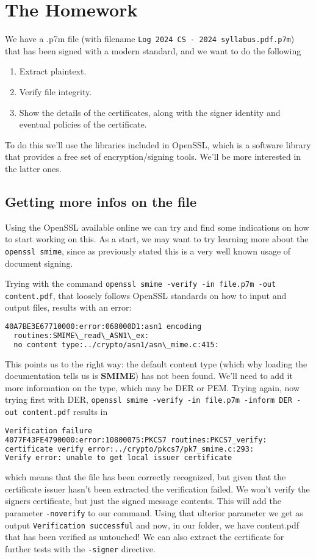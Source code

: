 \documentclass{article}
\begin{document}
\section{The Homework}
We have a .p7m file (with filename \texttt{Log 2024 CS - 2024 syllabus.pdf.p7m}) that has been signed with a modern standard, and we want to do the following
\begin{enumerate}
    \item Extract plaintext.
    \item Verify file integrity.
    \item Show the details of the certificates, along with the signer identity and eventual policies of the certificate.
\end{enumerate}
To do this we'll use the libraries included in OpenSSL, which is a software library that provides a free set of encryption/signing tools. We'll be more interested in the latter ones.

\subsection{Getting more infos on the file}
Using the OpenSSL available online we can try and find some indications on how to start working on this. 
As a start, we may want to try learning more about the \texttt{openssl smime}, since as previously stated this is a very well known usage of document signing.

Trying with the command \texttt{openssl smime -verify -in file.p7m -out content.pdf}, that loosely follows OpenSSL standards on how to input and output files, results with an error:
\begin{lstlisting}[language=bash]
  40A7BE3E67710000:error:068000D1:asn1 encoding 
  routines:SMIME\_read\_ASN1\_ex:
  no content type:../crypto/asn1/asn\_mime.c:415:
\end{lstlisting}
This points us to the right way: the default content type (which why loading the documentation tells us is \textbf{SMIME}) has not been found. We'll need to add it more information on the type, which may be DER or PEM.
Trying again, now trying first with DER, \texttt{openssl smime -verify -in file.p7m -inform DER -out content.pdf} results in 
\begin{lstlisting}[language=bash]
    Verification failure
4077F43FE4790000:error:10800075:PKCS7 routines:PKCS7_verify:
certificate verify error:../crypto/pkcs7/pk7_smime.c:293:
Verify error: unable to get local issuer certificate
\end{lstlisting}
which means that the file has been correctly recognized, but given that the certificate issuer hasn't been extracted the verification failed.
We won't verify the signers certificate, but just the signed message contents. This will add the parameter \texttt{-noverify} to our command.
Using that ulterior parameter we get as output \texttt{Verification successful} and now, in our folder, we have content.pdf that has been verified as untouched!
We can also extract the certificate for further tests with the \texttt{-signer} directive.
\end{document}
